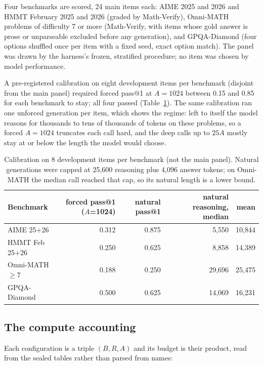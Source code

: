 \documentclass[11pt]{article}
\begin{document}
Four benchmarks are scored, 24 main items each: AIME 2025 and 2026 and HMMT
February 2025 and 2026 (graded by Math-Verify), Omni-MATH problems of difficulty 7 or more (Math-Verify,
with items whose gold answer is prose or unparseable excluded before any generation), and GPQA-Diamond
(four options shuffled once per item with a fixed seed, exact option match). The panel was drawn by the
harness's frozen, stratified procedure; no item was chosen by model performance.

A pre-registered calibration on eight development items per benchmark (disjoint from the main panel)
required forced pass@1 at $A=1024$ between 0.15 and 0.85 for each benchmark to stay; all four passed
(Table~\ref{tab:cal}). The same calibration ran one unforced generation per item, which shows the regime:
left to itself the model reasons for thousands to tens of thousands of tokens on these problems, so a
forced $A = 1024$ truncates each call hard, and the deep calls up to $25A$ mostly stay at or below the
length the model would choose.

\begin{table}[htbp]
\centering
\small
\begin{tabular}{lrrrr}
\toprule
Benchmark & forced pass@1 ($A$=1024) & natural pass@1 & natural reasoning, median & mean \\
\midrule
AIME 25+26 & 0.312 & 0.875 & 5,550 & 10,844 \\
HMMT Feb 25+26 & 0.250 & 0.625 & 8,858 & 14,389 \\
Omni-MATH $\geq$7 & 0.188 & 0.250 & 29,696 & 25,475 \\
GPQA-Diamond & 0.500 & 0.625 & 14,069 & 16,231 \\
\bottomrule
\end{tabular}
\caption{Calibration on 8 development items per benchmark (not the main panel). Natural generations were
capped at 25,600 reasoning plus 4,096 answer tokens; on Omni-MATH the median call reached that cap, so its
natural length is a lower bound.}
\label{tab:cal}
\end{table}

\subsection{The compute accounting}

Each configuration is a triple $(B, R, A)$ and its budget is their product, read from the sealed
tables rather than parsed from names:
\end{document}

